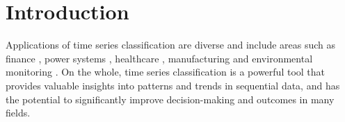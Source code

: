 
\section{Introduction}\label{sec:introduction_4}








Applications of time series classification are diverse and include areas such as finance \cite{majumdar2020clustering}, power systems \cite{susto2018time}, healthcare \cite{wang2022multihead}, manufacturing \cite{hsu2021multiple} and environmental monitoring \cite{gundersen2020binary}. On the whole, time series classification is a powerful tool that provides valuable insights into patterns and trends in sequential data, and has the potential to significantly improve decision-making and outcomes in many fields. 

